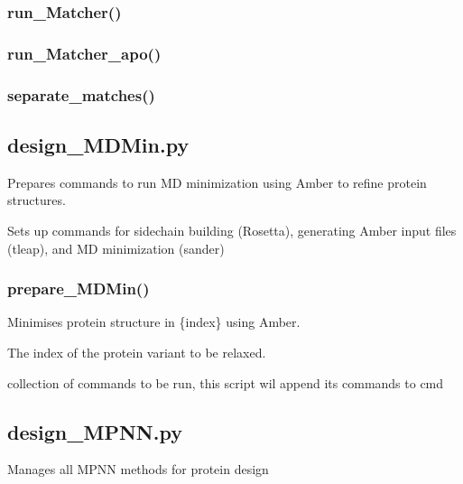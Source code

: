 \documentclass[10pt]{extarticle}
\begin{document}
\subsubsection{run\_Matcher()}
\subsubsection{run\_Matcher\_apo()}
\subsubsection{separate\_matches()}
\subsection{design\_MDMin.py}
Prepares commands to run MD minimization using Amber to refine protein structures.

\par\vspace*{0.5\baselineskip}
{
\begin{description}[noitemsep,topsep=0pt,parsep=0pt,labelwidth=5cm,leftmargin=!,labelindent=0pt,labelsep=0.2cm,itemsep=0pt]
\item[\textcolor{mpgAccentBlue!75!white}{- prepare\_MDMin()\dotfill}] Sets up commands for sidechain building (Rosetta), generating Amber input files (tleap), and MD minimization (sander)
\end{description}
}
\subsubsection{prepare\_MDMin()}
Minimises protein structure in \{index\} using Amber.

\par\vspace*{0.5\baselineskip}
{
\begin{description}[noitemsep,topsep=0pt,parsep=0pt,labelwidth=5cm,leftmargin=!,labelindent=0pt,labelsep=0.2cm,itemsep=0pt]
\item[\textcolor{mpgAccentBlue!75!white}{- index (str)\dotfill}] The index of the protein variant to be relaxed.
\item[\textcolor{mpgAccentBlue!75!white}{- cmd (str)\dotfill}] collection of commands to be run, this script wil append its commands to cmd
\end{description}
}
\subsection{design\_MPNN.py}
Manages all MPNN methods for protein design
\end{document}

